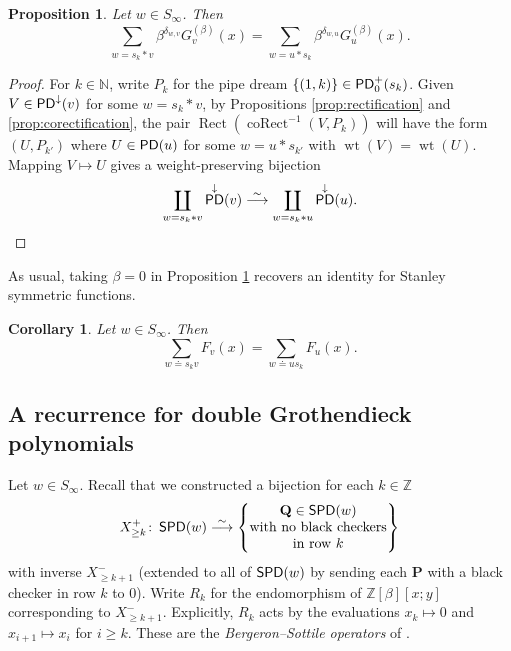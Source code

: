 \documentclass[11pt,reqno]{amsart} %
\newcommand{\bbN}{\mathbb{N}}
\newcommand{\bbZ}{\mathbb{Z}}
\newcommand{\bfP}{\mathbf{P}}
\newcommand{\bfQ}{\mathbf{Q}}
\DeclareMathOperator{\wt}{wt}
\DeclareMathOperator{\PD}{\sf{PD}}
\DeclareMathOperator{\SPD}{\sf{SPD}}
\DeclareMathOperator{\Rect}{Rect} %
\DeclareMathOperator{\coRect}{coRect} %
\newtheorem{proposition}[theorem]{Proposition}
\newtheorem{corollary}[theorem]{Corollary}
\theoremstyle{definition}
\begin{document}
\begin{proposition}
\label{prop:stable Groth}
Let $w\in S_\infty$.
Then \[
    \sum_{w=s_k*v}
    \beta^{\delta_{w,v}} G_v^{(\beta)}(x)
    = \sum_{w=u*s_k}
    \beta^{\delta_{w,u}} G_u^{(\beta)}(x).
\]
\end{proposition}

\begin{proof}
For $k\in\bbN$, write $P_k$ for the pipe dream $\{(1,k)\}\in \PD_0^+(s_k)$.
Given $V\in \PD^\downarrow(v)$ for some $w = s_k*v$, by Propositions \ref{prop:rectification} and \ref{prop:corectification}, the pair $\Rect(\coRect^{-1}(V,P_k))$ will have the form $(U,P_{k'})$ where $U\in \PD(u)$ for some $w = u*s_{k'}$ with $\wt(V) = \wt(U)$.
Mapping $V\mapsto U$ gives a weight-preserving bijection \[
    \coprod_{w=s_k*v} \PD^\downarrow(v)
    \overset\sim\longrightarrow
    \coprod_{w=s_k*u} \PD^\downarrow(u).
    \qedhere
\]
\end{proof}

As usual, taking $\beta = 0$ in Proposition \ref{prop:stable Groth} recovers an identity for Stanley symmetric functions.

\begin{corollary}
\label{cor:Stanley symmetric}
Let $w\in S_\infty$.
Then \[
    \sum_{w\doteq s_kv}
    F_v(x)
    = \sum_{w\doteq us_k}
    F_u(x).
\]
\end{corollary}




\subsection{A recurrence for double Grothendieck polynomials}
\label{subsect:R_k recurrence}

Let $w\in S_\infty$.
Recall that we constructed a bijection for each $k\in\bbZ$ \[
    X^+_{\geq k}\colon \SPD(w)
    \overset\sim\longrightarrow
    \left\{\begin{tabular}{@{} c @{}}
        $\bfQ\in \SPD(w)$ \\
        with no black checkers \\
        in row $k$
    \end{tabular}\right\}
\] with inverse $X^-_{\geq k+1}$ (extended to all of $\SPD(w)$ by sending each $\bfP$ with a black checker in row $k$ to $0$).
Write $R_k$ for the endomorphism of $\bbZ[\beta][x;y]$ corresponding to $X^-_{\geq k+1}$.
Explicitly, $R_k$ acts by the evaluations $x_k\mapsto 0$ and $x_{i+1} \mapsto x_i$ for $i\geq k$.
These are the \textit{Bergeron--Sottile operators} of \cite{BergeronSottile98}.
\end{document}
